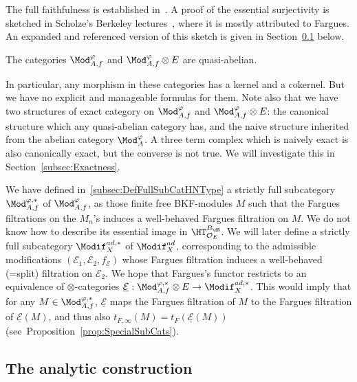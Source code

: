 The full faithfulness is established in~\cite[4.29]{BaMoSc16}. A proof of the essential surjectivity is sketched in Scholze's Berkeley lectures~\cite{ScWe15}, where it is mostly attributed to Fargues. An expanded and referenced version of this sketch is given in Section~\ref{subsec:AnalConstruction} below.

\begin{coro}
The categories $\Mod_{A,f}^{\varphi}$ and $\Mod_{A,f}^{\varphi}\otimes E$ are quasi-abelian.
\end{coro}

In particular, any morphism in these categories has a kernel and a cokernel. But we have no explicit and manageable formulas for them. Note also that we have two structures of exact category on $\Mod_{A,f}^{\varphi}$ and $\Mod_{A,f}^{\varphi}\otimes E$: the canonical structure which any quasi-abelian category has, and the naive structure inherited from the abelian category $\Mod_{A}^{\varphi}$. A three term complex which is naively exact is also canonically exact, but the converse is not true. We will investigate this in Section~\ref{subsec:Exactness}.
\begin{rema}
We have defined in~\ref{subsec:DefFullSubCatHNType} a strictly full subcategory $\Mod_{A,f}^{\varphi,\ast}$ of $\Mod_{A,f}^{\varphi}$, as those finite free BKF-modules $M$ such that the Fargues filtrations on the $M_{n}$'s induces a well-behaved Fargues filtration on $M$. We do not know how to describe its essential image in $\HT_{\mathcal{O}_{E}}^{B_{\dR}}$. We will later define a strictly full subcategory $\Modif_{X}^{ad,\ast}$ of $\Modif_{X}^{ad}$, corresponding to the admissible modifications $(\mathcal{E}_{1},\mathcal{E}_{2},f_{\mathcal{E}})$ whose Fargues filtration induces a well-behaved (=split) filtration on $\mathcal{E}_{2}$. We hope that Fargues's functor restricts to an equivalence of $\otimes$-categories $\underline{\mathcal{E}}:\Mod_{A,f}^{\varphi,\ast}\otimes E\rightarrow\Modif_{X}^{ad,\ast}$. This would imply that for any $M\in\Mod_{A,f}^{\varphi,\ast}$, $\underline{\mathcal{E}}$ maps the Fargues filtration of $M$ to the Fargues filtration of $\underline{\mathcal{E}}(M)$, and thus also $t_{F,\infty}(M)=t_{F}(\underline{\mathcal{E}}(M))$ (see~Proposition~\ref{prop:SpecialSubCats}).
\end{rema}

\subsection{The analytic construction}\label{subsec:AnalConstruction}

